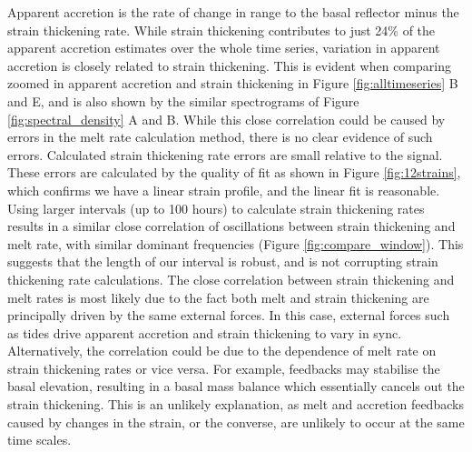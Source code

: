 Apparent accretion is the rate of change in range to the basal reflector minus the strain thickening rate. While strain thickening contributes to just 24\% of the apparent accretion estimates over the whole time series, variation in apparent accretion is closely related to strain thickening. This is evident when comparing zoomed in apparent accretion and strain thickening in Figure \ref{fig:alltimeseries} B and E, and is also shown by the similar spectrograms of Figure \ref{fig:spectral_density} A and B. While this close correlation could be caused by errors in the melt rate calculation method, there is no clear evidence of such errors. Calculated strain thickening rate errors are small relative to the signal. These errors are calculated by the quality of fit as shown in Figure \ref{fig:12strains}, which confirms we have a linear strain profile, and the linear fit is reasonable. 
Using larger intervals (up to 100 hours) to calculate strain thickening rates results in a similar close correlation of oscillations between strain thickening and melt rate, with similar dominant frequencies (Figure \ref{fig:compare_window}). This suggests that the length of our interval is robust, and is not corrupting strain thickening rate calculations. 
The close correlation between strain thickening and melt rates is most likely due to the fact both melt and strain thickening are principally driven by the same external forces. In this case, external forces such as tides drive apparent accretion and strain thickening to vary in sync. Alternatively, the correlation could be due to the dependence of melt rate on strain thickening rates or vice versa.  For example, feedbacks may stabilise the basal elevation,  resulting in a basal mass balance which essentially cancels out the strain thickening. This is an unlikely explanation, as melt and accretion feedbacks caused by changes in the strain, or the converse, are unlikely to occur at the same time scales. 

